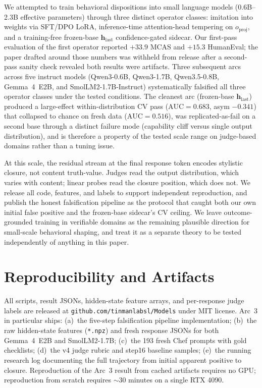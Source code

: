 \documentclass[11pt,a4paper]{article}
\begin{document}
We attempted to train behavioral dispositions into small language models (0.6B--2.3B effective parameters) through three distinct operator classes: imitation into weights via SFT/DPO LoRA, inference-time attention-head tempering on $o_{\text{proj}}$, and a training-free frozen-base $\mathbf{h}_{\text{last}}$ confidence-gated sidecar. Our first-pass evaluation of the first operator reported $+33.9$ MCAS and $+15.3$ HumanEval; the paper drafted around those numbers was withheld from release after a second-pass sanity check revealed both results were artifacts. Three subsequent arcs across five instruct models (Qwen3-0.6B, Qwen3-1.7B, Qwen3.5-0.8B, Gemma~4~E2B, and SmolLM2-1.7B-Instruct) systematically falsified all three operator classes under the tested conditions. The cleanest arc (frozen-base $\mathbf{h}_{\text{last}}$) produced a large-effect within-distribution CV pass ($\text{AUC}{=}0.683$, asym $-0.341$) that collapsed to chance on fresh data ($\text{AUC}{=}0.516$), was replicated-as-fail on a second base through a distinct failure mode (capability cliff versus single output distribution), and is therefore a property of the tested scale range on judge-based domains rather than a tuning issue.

At this scale, the residual stream at the final response token encodes stylistic closure, not content truth-value. Judges read the output distribution, which varies with content; linear probes read the closure position, which does not. We release all code, features, and labels to support independent reproduction, and publish the honest falsification pipeline as the protocol that caught both our own initial false positive and the frozen-base sidecar's CV ceiling. We leave outcome-grounded training in verifiable domains as the remaining plausible direction for small-scale behavioral shaping, and treat it as a separate theory to be tested independently of anything in this paper.

\section*{Reproducibility and Artifacts}

All scripts, result JSONs, hidden-state feature arrays, and per-response judge labels are released at \texttt{github.com/tinmanlabsl/Models} under MIT license. Arc~3 in particular ships: (a)~the five-step falsification pipeline implementation; (b)~the raw hidden-state features (\texttt{*.npz}) and fresh response JSONs for both Gemma~4~E2B and SmolLM2-1.7B; (c)~the 193 fresh Chef prompts with gold checklists; (d)~the v4 judge rubric and step16 baseline samples; (e)~the running research log documenting the full trajectory from initial apparent positive to closure. Reproduction of the Arc~3 result from cached artifacts requires no GPU; reproduction from scratch requires $\sim$30 minutes on a single RTX 4090.
\end{document}
